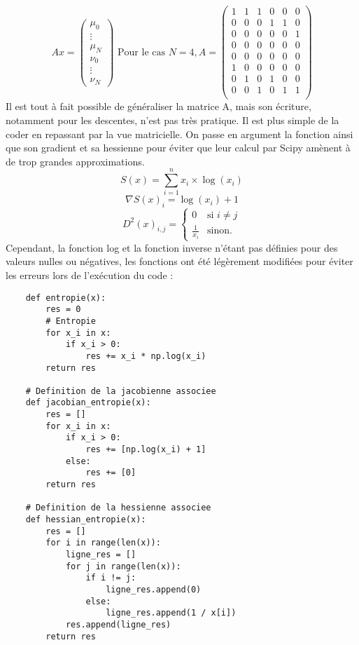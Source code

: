 \documentclass[12pt]{article}
\begin{document}
\[
Ax =
\begin{pmatrix}
\mu_0\\
\vdots\\
\mu_N\\
\nu_0\\
\vdots\\
\nu_N
\end{pmatrix}
\text{ Pour le cas } N=4, A =
\begin{pmatrix}
1 & 1 & 1 & 0 & 0 & 0\\
0 & 0 & 0 & 1 & 1 & 0\\
0 & 0 & 0 & 0 & 0 & 1\\
0 & 0 & 0 & 0 & 0 & 0\\
0 & 0 & 0 & 0 & 0 & 0\\
1 & 0 & 0 & 0 & 0 & 0\\
0 & 1 & 0 & 1 & 0 & 0\\
0 & 0 & 1 & 0 & 1 & 1\\
\end{pmatrix}\]
Il est tout à fait possible de généraliser la matrice A, mais son écriture, notamment pour les descentes, n'est pas très pratique. Il est plus simple de la coder en repassant par la vue matricielle. On passe en argument la fonction ainsi que son gradient et sa hessienne pour éviter que leur calcul par Scipy amènent à de trop grandes approximations. 
\[ S(x) = \sum^{n}_{i=1} x_i\times\log(x_i)\]
\[ \nabla S(x)_i = \log(x_i) + 1\]
\[D^2(x)_{i,j}  = \left\{
    \begin{array}{ll}
        0 & \mbox{si } i \neq j \\
        \frac{1}{x_i} & \mbox{sinon.}
    \end{array}
\right.\]
Cependant, la fonction log et la fonction inverse n'étant pas définies pour des valeurs nulles ou négatives, les fonctions ont été légèrement modifiées pour éviter les erreurs lors de l'exécution du code :
\begin{lstlisting}
    def entropie(x):
        res = 0
        # Entropie
        for x_i in x:
            if x_i > 0:
                res += x_i * np.log(x_i)
        return res

    # Definition de la jacobienne associee
    def jacobian_entropie(x):
        res = []
        for x_i in x:
            if x_i > 0:
                res += [np.log(x_i) + 1]
            else:
                res += [0]
        return res

    # Definition de la hessienne associee
    def hessian_entropie(x):
        res = []
        for i in range(len(x)):
            ligne_res = []
            for j in range(len(x)):
                if i != j:
                    ligne_res.append(0)
                else:
                    ligne_res.append(1 / x[i])
            res.append(ligne_res)
        return res

\end{lstlisting}
\end{document}
